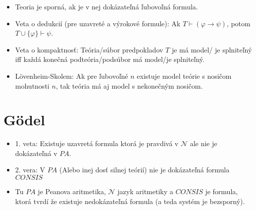 \documentclass[paper=a4, fontsize=11pt]{scrartcl} %
\numberwithin{equation}{section} %
\numberwithin{figure}{section} %
\numberwithin{table}{section} %
\begin{document}
\begin{itemize}
		\item Teoria je sporná, ak je v nej dokázateľná ľubovoľná formula. 
		
		\item Veta o dedukcií (pre uzavreté a výrokové formule): Ak $T \vdash (\varphi \to \psi)$, potom $T \cup \{\varphi\} \vdash \psi$.
	
		\item Veta o kompaktnosť: Teória/súbor predpokladov $T$ je má model/ je splniteľný iff každá konečná podteória/podsúbor má model/je splniteľný.
		
		\item Lövenheim-Skolem: Ak pre ľubovoľné $n$ existuje model teórie s nosičom mohutnosti $n$, tak teória má aj model s nekonečným nosičom.		
		
	\end{itemize}

	\section{Gödel}

	\begin{itemize}
		\item 1. veta: Existuje uzavretá formula ktorá je pravdivá v $\mathcal{N}$ ale nie je dokázateľná v $PA$.
		\item 2. vera: V $PA$ (Alebo inej dosť silnej teórií) nie je dokázateľná formula $CONSIS$
		\item Tu $PA$ je Peanova aritmetika, $\mathcal{N}$ jazyk aritmetiky a $CONSIS$ je formula, ktorá tvrdí že existuje nedokázateľná formula (a teda systém je bezsporný).
	\end{itemize}
\end{document}
